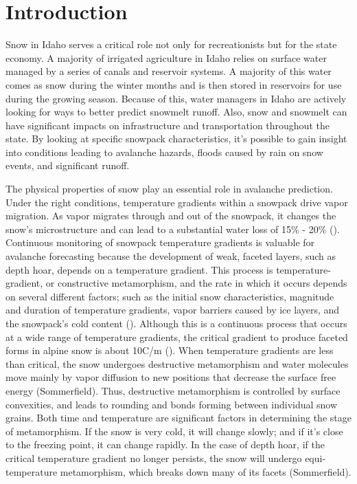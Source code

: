 \chapter{Introduction}
Snow in Idaho serves a critical role not only for recreationists but for the state economy. A majority of irrigated agriculture in Idaho relies on surface water managed by a series of canals and reservoir systems. A majority of this water comes as snow during the winter months and is then stored in reservoirs for use during the growing season. Because of this, water managers in Idaho are actively looking for ways to better predict snowmelt runoff. Also, snow and snowmelt can have significant impacts on infrastructure and transportation throughout the state. By looking at specific snowpack characteristics, it's possible to gain insight into conditions leading to avalanche hazards, floods caused by rain on snow events, and significant runoff.  

The physical properties of snow play an essential role in avalanche prediction. Under the right conditions, temperature gradients within a snowpack drive vapor migration. As vapor migrates through and out of the snowpack, it changes the snow's microstructure and can lead to a substantial water loss of 15\% - 20\% (\cite{hood_williams_cline_1999, marks_dozier_1992, kattelmann_elder_1991}). Continuous monitoring of snowpack temperature gradients is valuable for avalanche forecasting because the development of weak, faceted layers, such as depth hoar, depends on a temperature gradient. This process is temperature-gradient, or constructive metamorphism, and the rate in which it occurs depends on several different factors; such as the initial snow characteristics, magnitude and duration of temperature gradients, vapor barriers caused by ice layers, and the snowpack's cold content (\cite{sommerfeld_1970, colbeck1983theory}). Although this is a continuous process that occurs at a wide range of temperature gradients, the critical gradient to produce faceted forms in alpine snow is about 10\textdegree C/m (\cite{mcclung_schaerer_2009}). When temperature gradients are less than critical, the snow undergoes destructive metamorphism and water molecules move mainly by vapor diffusion to new positions that decrease the surface free energy (Sommerfield). Thus, destructive metamorphism is controlled by surface convexities, and leads to rounding and bonds forming between individual snow grains. Both time and temperature are significant factors in determining the stage of metamorphism. If the snow is very cold, it will change slowly; and if it's close to the freezing point, it can change rapidly. In the case of depth hoar, if the critical temperature gradient no longer persists, the snow will undergo equi-temperature metamorphism, which breaks down many of its facets (Sommerfield).

